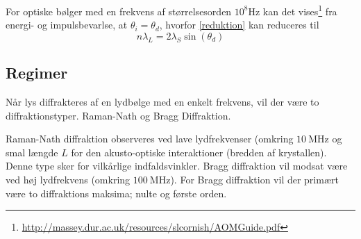 \documentclass[main]{subfiles}
\begin{document}
For optiske bølger med en frekvens af størrelsesorden $10^8\si{\hertz}$ kan det vises\footnote{\url{http://massey.dur.ac.uk/resources/slcornish/AOMGuide.pdf}} fra energi- og impulsbevarlse, at $\theta_i = \theta_d$, hvorfor \cref{reduktion} kan reduceres til
\begin{equation}
    n\lambda_L = 2\lambda_S \sin(\theta_d)
    \label{eq:interferens}
\end{equation}
%
%
%
%
\subsection{Regimer}
Når lys diffrakteres af en lydbølge med en enkelt frekvens, vil der være to diffraktionstyper. Raman-Nath og Bragg Diffraktion.

Raman-Nath diffraktion observeres ved lave lydfrekvenser (omkring $\SI{10}{\mega\hertz}$ og smal længde $L$ for den akusto-optiske interaktioner (bredden af krystallen). Denne type sker for vilkårlige indfaldsvinkler.
Bragg diffraktion vil modsat være ved høj lydfrekvens (omkring $\SI{100}{\mega\hertz}$). For Bragg diffraktion vil der primært være to diffraktions maksima; nulte og første orden.
\end{document}
